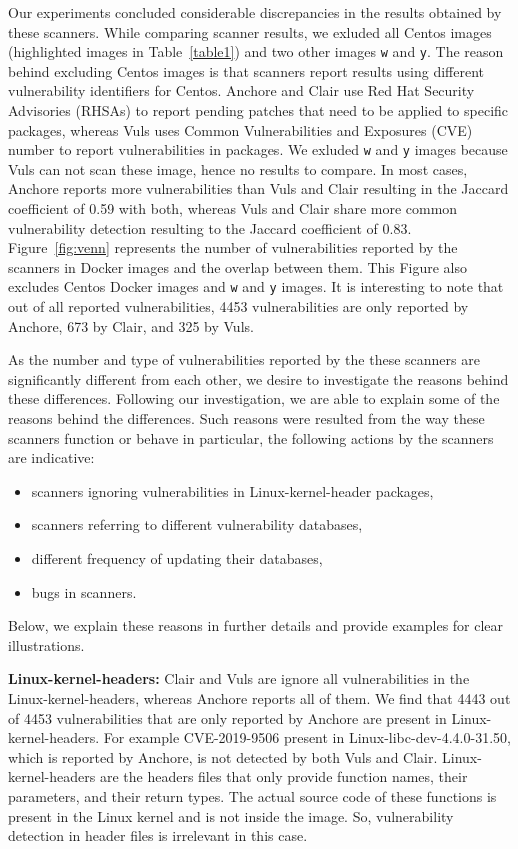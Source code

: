 \documentclass[a4paper,num-refs]{oup-contemporary}
\begin{document}
Our experiments concluded considerable discrepancies in the results obtained by
these scanners. %
While comparing scanner results, we exluded all Centos images (highlighted images in Table~\ref{table1})
and two other images \texttt{w} and
\texttt{y}. The reason behind excluding Centos images is that scanners report results using different
vulnerability identifiers for Centos. Anchore and Clair use Red Hat Security Advisories (RHSAs)
to report pending patches that need to be applied to specific packages,
whereas Vuls uses Common Vulnerabilities and Exposures (CVE) number to report
vulnerabilities in packages. We exluded \texttt{w} and \texttt{y} images because Vuls
can not scan these image, hence no results to compare.
In most cases,
Anchore reports more vulnerabilities than Vuls and Clair resulting in 
the Jaccard coefficient of 0.59 with both,
whereas Vuls and Clair share more common vulnerability detection resulting to the Jaccard coefficient of 0.83.
Figure~\ref{fig:venn} represents the number of vulnerabilities reported by
the scanners in Docker images and the overlap between them.
This Figure also excludes Centos Docker images and \texttt{w} and \texttt{y} images.
It is interesting to note that out of all reported vulnerabilities, 4453 vulnerabilities are only
reported by Anchore, 673 by Clair, and 325 by Vuls.

As the number and type of vulnerabilities reported by the these scanners are significantly different from each other,
we desire to investigate the reasons behind these differences.
Following our investigation, we are able to explain some of the reasons behind
the differences. 
Such reasons were resulted from the way these scanners function or behave 
in particular, the following actions by the scanners are indicative:
\begin{itemize}
   \item scanners ignoring vulnerabilities in Linux-kernel-header packages,
   \item scanners referring to different vulnerability databases,
   \item different frequency of updating their databases,
   \item bugs in scanners. 
\end{itemize}

Below, we explain these reasons in further details and provide examples
for clear illustrations.

\textbf{Linux-kernel-headers:} Clair and Vuls are ignore all vulnerabilities in the Linux-kernel-headers,
whereas Anchore reports all of them.
We find that 4443 out of 4453 vulnerabilities that are only reported by Anchore are present in Linux-kernel-headers.
For example CVE-2019-9506 present in Linux-libc-dev-4.4.0-31.50, which is reported by Anchore, is not
detected by both Vuls and Clair.
Linux-kernel-headers are the headers files that only provide function names, their parameters, and their
return types.
The actual source code of these functions is present in the Linux kernel and is not inside the image.
So, vulnerability detection in header files
is irrelevant in this case.
\end{document}
